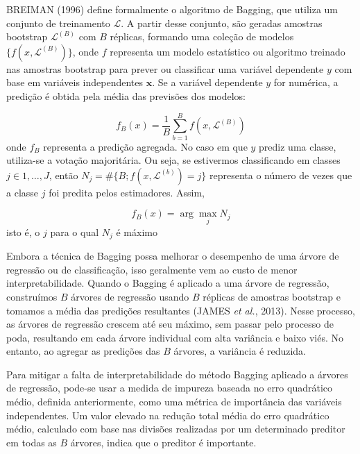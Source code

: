 \documentclass[
  12pt,
  a4paper,
]{scrreprt}
\begin{document}
\vspace{12pt}

BREIMAN (1996) define formalmente o algoritmo de Bagging, que utiliza um
conjunto de treinamento \(\mathcal{L}\). A partir desse conjunto, são
geradas amostras bootstrap \(\mathcal{L}^{(B)}\) com \(B\) réplicas,
formando uma coleção de modelos \(\{f(x, \mathcal{L}^{(B)})\}\), onde
\(f\) representa um modelo estatístico ou algoritmo treinado nas
amostras bootstrap para prever ou classificar uma variável dependente
\(y\) com base em variáveis independentes \(\mathbf{x}\). Se a variável
dependente \(y\) for numérica, a predição é obtida pela média das
previsões dos modelos:

\[
f_{B}\left(x\right) = \frac{1}{B} \sum_{b = 1}^B f \left(x, \mathcal{L}^{\left(B\right)}\right)
\] onde \(f_{B}\) representa a predição agregada. No caso em que \(y\)
prediz uma classe, utiliza-se a votação majoritária. Ou seja, se
estivermos classificando em classes \(j \in {1, \dots, J}\), então
\(N_j = \#\{B; f(x, \mathcal{L}^{(b)}) = j\}\) representa o número de
vezes que a classe \(j\) foi predita pelos estimadores. Assim,

\[
f_{B}\left(x\right) = \arg \max_{j} N_j
\] isto é, o \(j\) para o qual \(N_j\) é máximo

\vspace{12pt}

Embora a técnica de Bagging possa melhorar o desempenho de uma árvore de
regressão ou de classificação, isso geralmente vem ao custo de menor
interpretabilidade. Quando o Bagging é aplicado a uma árvore de
regressão, construímos \(B\) árvores de regressão usando \(B\) réplicas
de amostras bootstrap e tomamos a média das predições resultantes (JAMES
\emph{et al.}, 2013). Nesse processo, as árvores de regressão crescem
até seu máximo, sem passar pelo processo de poda, resultando em cada
árvore individual com alta variância e baixo viés. No entanto, ao
agregar as predições das \(B\) árvores, a variância é reduzida.

\vspace{12pt}

Para mitigar a falta de interpretabilidade do método Bagging aplicado a
árvores de regressão, pode-se usar a medida de impureza baseada no erro
quadrático médio, definida anteriormente, como uma métrica de
importância das variáveis independentes. Um valor elevado na redução
total média do erro quadrático médio, calculado com base nas divisões
realizadas por um determinado preditor em todas as \(B\) árvores, indica
que o preditor é importante.
\end{document}
